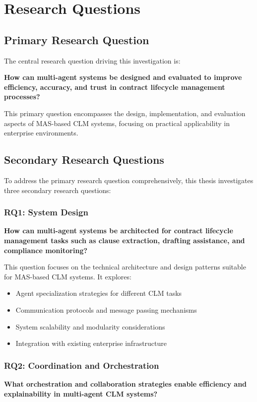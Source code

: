 
\chapter{Research Questions}\label{chapter:research_questions}

\section{Primary Research Question}

The central research question driving this investigation is:

\textbf{How can multi-agent systems be designed and evaluated to improve efficiency, accuracy, and trust in contract lifecycle management processes?}

This primary question encompasses the design, implementation, and evaluation aspects of MAS-based CLM systems, focusing on practical applicability in enterprise environments.

\section{Secondary Research Questions}

To address the primary research question comprehensively, this thesis investigates three secondary research questions:

\subsection{RQ1: System Design}
\textbf{How can multi-agent systems be architected for contract lifecycle management tasks such as clause extraction, drafting assistance, and compliance monitoring?}

This question focuses on the technical architecture and design patterns suitable for MAS-based CLM systems. It explores:
\begin{itemize}
    \item Agent specialization strategies for different CLM tasks
    \item Communication protocols and message passing mechanisms
    \item System scalability and modularity considerations
    \item Integration with existing enterprise infrastructure
\end{itemize}

\subsection{RQ2: Coordination and Orchestration}
\textbf{What orchestration and collaboration strategies enable efficiency and explainability in multi-agent CLM systems?}

